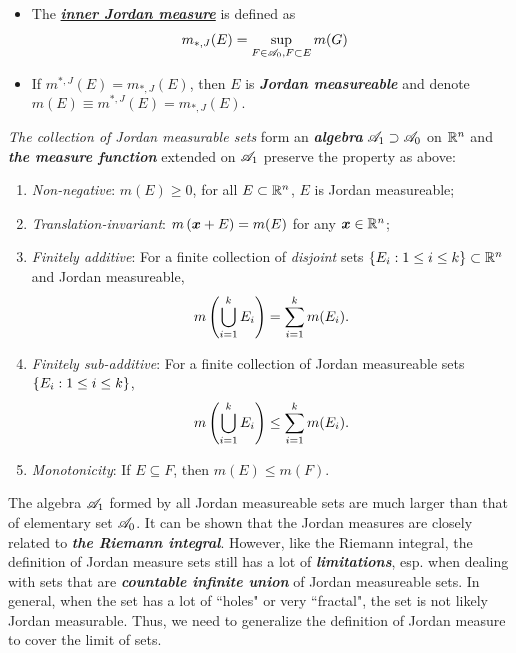 \documentclass[11pt]{article}
\begin{document}
\begin{enumerate}
\begin{itemize}
\item The \underline{\emph{\textbf{inner Jordan measure}}} is defined as 
\begin{align*}
m_{*, J}(E) &= \sup\limits_{F\in {\mathscr A}_{0}, F\subset E}m(G)
\end{align*}

\item If $m^{*, J}(E)  = m_{*, J}(E)$, then $E$ is \emph{\textbf{Jordan measureable}} and denote $m(E) \equiv m^{*, J}(E)  = m_{*, J}(E).$
\end{itemize} 

 \emph{The collection of Jordan measurable sets} form an \emph{\textbf{algebra}} ${\mathscr A}_{1} \supset {\mathscr A}_{0}$ on ${\mathbb R}^{n}$ and \emph{\textbf{the measure function}} extended on ${\mathscr A}_{1}$ preserve the property as above: 
\begin{enumerate}
\item \emph{Non-negative}: $m(E) \ge 0$, for all $E\subset {\mathbb R}^{n}$, $E$ is Jordan measureable;
\item \emph{Translation-invariant}: $m\left(\boldsymbol{x}+ E\right) = m(E)$ for any $\boldsymbol{x}\in {\mathbb R}^{n}$; 
\item \emph{Finitely additive}: For a finite collection of \emph{disjoint} sets $\left\{E_{i}: 1\le i\le k\right\} \subset {\mathbb R}^{n}$ and Jordan measureable,  
$$ m\left(\bigcup_{i=1}^{k}E_{i}\right)= \sum_{i=1}^{k}m(E_{i}).$$
\item \emph{Finitely sub-additive}: For a finite collection of Jordan measureable sets $\left\{E_{i}: 1\le i\le k\right\}$, 
$$ m\left(\bigcup_{i=1}^{k}E_{i}\right) \le  \sum_{i=1}^{k}m(E_{i}).$$
\item \emph{Monotonicity}:  If $E \subseteq F$, then $m(E) \le m(F)$.
\end{enumerate}

\begin{remark}
The algebra ${\mathscr A}_{1}$ formed by all Jordan measureable sets are much larger than that of elementary set ${\mathscr A}_{0}$. It can be shown that the Jordan measures are closely related to \emph{\textbf{the Riemann integral}}.  However, like the Riemann integral, the definition of Jordan measure sets still has a lot of \emph{\textbf{limitations}}, esp. when dealing with sets that are \emph{\textbf{countable infinite union}} of Jordan measureable sets. In general, when the set has a lot of ``holes" or very ``fractal", the set is not likely Jordan measurable. Thus, we need to generalize the definition of Jordan measure to cover the limit of sets.
\end{remark}


\end{enumerate}
\end{document}
